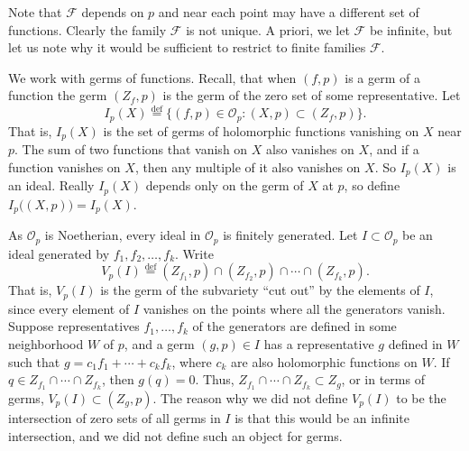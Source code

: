 \documentclass[12pt,openany]{book}
\newcommand{\sF}{{\mathscr{F}}}
\newcommand{\sO}{{\mathscr{O}}}
\theoremstyle{plain}
\theoremstyle{remark}
\theoremstyle{definition}
\theoremstyle{exercise}
\theoremstyle{example}
\begin{document}
Note that $\sF$ depends on $p$ and near each point may have a different set of
functions.  Clearly the family $\sF$ is not unique.  A priori, we let $\sF$
be infinite, but let us note why it would be sufficient
to restrict to finite families $\sF$.

We work with germs of functions.  Recall, that when $(f,p)$ is a germ of a function
the germ $(Z_f,p)$ is the germ of the zero set of some representative.
Let
%
\begin{equation*}
I_p(X) \overset{\text{def}}{=}
\bigl\{ (f,p) \in \sO_p : (X,p) \subset (Z_f,p) \bigr\} .
\end{equation*}
That is, $I_p(X)$ is the set of germs of holomorphic functions vanishing on
$X$ near $p$. 
The sum of two functions that vanish on $X$ also vanishes on $X$,
and if a function vanishes on $X$, then any multiple of it also
vanishes on $X$.  So $I_p(X)$ is an ideal.  Really $I_p(X)$ depends only on
the germ of $X$ at $p$, so define $I_p\bigl((X,p)\bigr) = I_p(X)$.

As $\sO_p$ is Noetherian, every ideal in $\sO_p$ is finitely generated.
Let $I \subset \sO_p$ be an ideal generated by $f_1,f_2,\ldots,f_k$.
Write
%
\begin{equation*}
V_p(I) \overset{\text{def}}{=}
(Z_{f_1},p) \cap (Z_{f_2},p) \cap \cdots \cap (Z_{f_k},p) .
\end{equation*}
That is, $V_p(I)$ is the germ of the subvariety ``cut out'' by the elements of $I$,
since every
element of $I$ vanishes on the points where all the generators vanish.
Suppose representatives $f_1,\ldots,f_k$ of the generators are defined
in some neighborhood $W$ of $p$,
and a germ $(g,p) \in I$ has a representative $g$ defined in $W$
such that $g = c_1 f_1 + \cdots + c_k f_k$, where $c_k$ are also holomorphic
functions on $W$.  If $q \in Z_{f_1} \cap \cdots \cap Z_{f_k}$,
then $g(q) = 0$.  Thus,
$Z_{f_1} \cap \cdots \cap Z_{f_k} \subset Z_g$, or in terms of germs,
$V_p(I) \subset (Z_g,p)$.  The reason why we did not define $V_p(I)$ to be the
intersection of zero sets of all germs in $I$ is that this would be an
infinite intersection, and we did not define such an object for germs.
\end{document}
